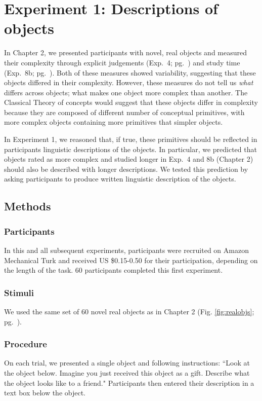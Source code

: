 \section{Experiment 1: Descriptions of objects}
In Chapter 2, we presented participants with novel, real objects and measured their complexity through explicit judgements (Exp.\ 4; pg.\ \pageref{ch2-4}) and study time (Exp.\ 8b; pg.\ \pageref{ch2-8b}). Both of these measures showed variability, suggesting that these objects differed in their complexity. However, these measures do not tell us {\it what} differs across objects; what makes one object more complex than another. The Classical Theory of concepts would suggest that these objects differ in complexity because they are composed of different number of conceptual primitives, with more complex objects containing more primitives that simpler objects. 

In Experiment 1, we reasoned that, if true, these primitives should be reflected in participants linguistic descriptions of the objects. In particular, we predicted that objects rated as more complex and studied longer in Exp.\ 4 and 8b (Chapter 2) should also be described with longer descriptions. We tested this prediction by asking participants to produce written linguistic description of the objects.



\subsection{Methods}
\subsubsection{Participants} 
In this and all subsequent experiments, participants were recruited on Amazon Mechanical Turk and received US \$0.15-0.50 for their participation, depending on the length of the task. 60 participants completed this first experiment.
\subsubsection{Stimuli} 
We used the same set of 60 novel real objects as in Chapter 2 (Fig. \ref{fig:realobjs}; pg.\ \pageref{fig:realobjs}).

\subsubsection{Procedure}
On each trial, we presented a single object and following instructions:  ``Look at the object below. Imagine you just received this object as a gift. Describe what the object looks like to a friend." Participants then entered their description in a text box below the object.

